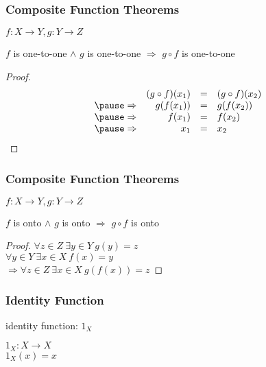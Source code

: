 \documentclass[dvipsnames]{beamer}
\begin{document}
\begin{frame}
  \frametitle{Composite Function Theorems}

  \begin{theorem}
    $f: X \rightarrow Y, g: Y \rightarrow Z$

    $f$ is one-to-one $\wedge$ $g$ is one-to-one
      $\Rightarrow$ $g \circ f$ is one-to-one
  \end{theorem}

  \pause
  \begin{proof}
    \[
      \begin{array}{crcl}
                  & (g \circ f) (x_1) & = & (g \circ f) (x_2)\\\pause
      \Rightarrow & g(f(x_1))         & = & g(f(x_2))\\\pause
      \Rightarrow & f(x_1)            & = & f(x_2)\\\pause
      \Rightarrow & x_1               & = & x_2
      \end{array}
    \]
  \end{proof}
\end{frame}

\begin{frame}
  \frametitle{Composite Function Theorems}

  \begin{theorem}
    $f: X \rightarrow Y, g: Y \rightarrow Z$

    $f$ is onto $\wedge$ $g$ is onto $\Rightarrow$ $g \circ f$ is onto
  \end{theorem}

  \pause
  \begin{proof}
    $\forall z \in Z~\exists y \in Y~g(y) = z$\\\pause
    $\forall y \in Y~\exists x \in X~f(x) = y$\\\pause
      $\Rightarrow \forall z \in Z~\exists x \in X~g(f(x)) = z$
  \end{proof}
\end{frame}

\begin{frame}
  \frametitle{Identity Function}

  \begin{definition}
    \alert{identity function}: $1_X$

    \medskip
    $1_X: X \rightarrow X$\\
    $1_X(x) = x$
  \end{definition}
\end{frame}
\end{document}
